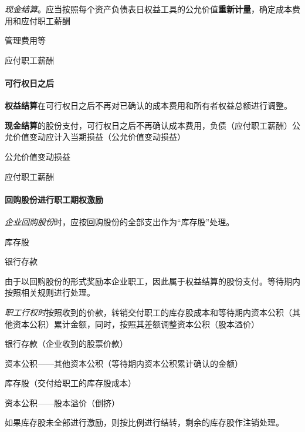 \documentclass[UTF8,12pt]{ctexart}
\newenvironment{Dr}{%
	\begin{list}{}%
		{
			\setlength{\leftmargin}{2em}
			\setlength{\labelwidth}{2em}
			\setlength{\labelsep}{0pt}
			\setlength{\itemindent}{0pt}
			\setlength{\listparindent}{0pt}
			\setlength{\parsep}{0pt}
			\setlength{\topsep}{0pt}
		}
		\item[\textbf{借：}]
	}{%
	\end{list}
}
\newenvironment{Cr}{%
	\begin{list}{}%
		{
			\setlength{\leftmargin}{3em}
			\setlength{\labelwidth}{2em}
			\setlength{\labelsep}{0pt}
			\setlength{\itemindent}{0pt}
			\setlength{\listparindent}{0pt}
			\setlength{\parsep}{0pt}
			\setlength{\topsep}{0pt}
		}
		\item[\textbf{贷：}]
	}{%
	\end{list}
}
\numberwithin{equation}{section} %
\numberwithin{figure}{section}
\numberwithin{table}{section}
\begin{document}
	\textit{现金结算}。应当按照每个资产负债表日权益工具的公允价值\textbf{重新计量}，确定成本费用和应付职工薪酬
	
	\begin{Dr}
		管理费用等
	\end{Dr}
	\begin{Cr}
		应付职工薪酬
	\end{Cr}
	
	\paragraph{可行权日之后}
	\textbf{权益结算}在可行权日之后不再对已确认的成本费用和所有者权益总额进行调整。
	
	\textbf{现金结算}的股份支付，可行权日之后不再确认成本费用，负债（应付职工薪酬）公允价值变动应计入当期损益（公允价值变动损益）

	\begin{Dr}
		公允价值变动损益
	\end{Dr}	
	\begin{Cr}
		应付职工薪酬
	\end{Cr}

	
	\paragraph{回购股份进行职工期权激励}
	\textit{企业回购股份}时，应按回购股份的全部支出作为“库存股”处理。
	
	\begin{Dr}
		库存股
	\end{Dr}
	\begin{Cr}
		银行存款
	\end{Cr}

	由于以回购股份的形式奖励本企业职工，因此属于权益结算的股份支付。等待期内按照相关规则进行处理。
	
	
	\textit{职工行权时}按照收到的价款，转销交付职工的库存股成本和等待期内资本公积（其他资本公积）累计金额，同时，按照其差额调整资本公积（股本溢价）
	
	\begin{Dr}
		银行存款（企业收到的股票价款）
		
		资本公积——其他资本公积（等待期内资本公积累计确认的金额）
	\end{Dr}
	\begin{Cr}
		库存股（交付给职工的库存股成本） 
		
		资本公积——股本溢价（倒挤）
	\end{Cr}

	如果库存股未全部进行激励，则按比例进行结转，剩余的库存股作注销处理。
	
\end{document}
